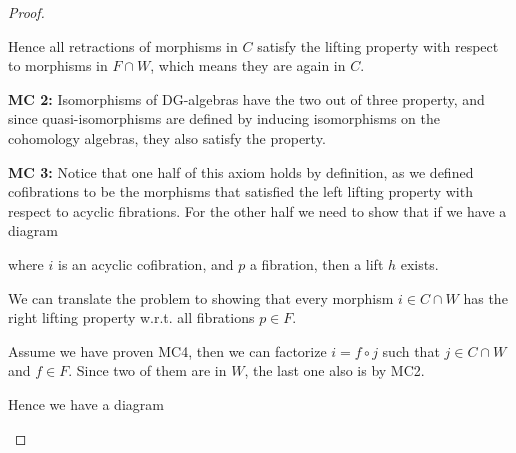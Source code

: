 \begin{proof}
\begin{center}
\begin{tikzpicture}[%
	cross line/.style={preaction={draw=white, -,line width=6pt}}]
\end{tikzpicture}
\end{center}
Hence all retractions of morphisms in $C$ satisfy the lifting property with respect to morphisms in $F\cap W$, which means they are again in $C$. 


\textbf{MC 2:} Isomorphisms of DG-algebras have the two out of three property, and since quasi-isomorphisms are defined by inducing isomorphisms on the cohomology algebras, they also satisfy the property. 
    
\textbf{MC 3:} Notice that one half of this axiom holds by definition, as we defined cofibrations to be the morphisms that satisfied the left lifting property with respect to acyclic fibrations. For the other half we need to show that if we have a diagram 
\begin{center}
\end{center}
where $i$ is an acyclic cofibration, and $p$ a fibration, then a lift $h$ exists. 
    
We can translate the problem to showing that every morphism $i\in C\cap W$ has the right lifting property w.r.t. all fibrations $p\in F$. 
    
Assume we have proven MC4, then we can factorize $i= f\circ j$ such that $j\in C\cap W$ and $f\in F$. Since two of them are in $W$, the last one also is by MC2.

Hence we have a diagram 
\begin{center}
\end{center}
    

\end{proof}

